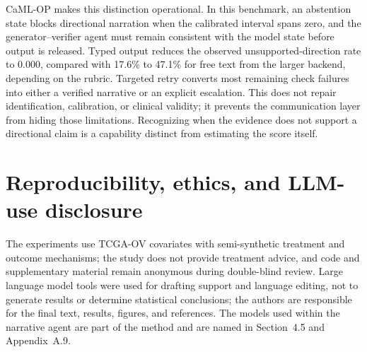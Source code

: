 \documentclass{article}
\begin{document}
CaML-OP makes this distinction operational. In this benchmark, an abstention state blocks directional narration when the calibrated interval spans zero, and the generator--verifier agent must remain consistent with the model state before output is released. Typed output reduces the observed unsupported-direction rate to 0.000, compared with 17.6\% to 47.1\% for free text from the larger backend, depending on the rubric. Targeted retry converts most remaining check failures into either a verified narrative or an explicit escalation. This does not repair identification, calibration, or clinical validity; it prevents the communication layer from hiding those limitations. Recognizing when the evidence does not support a directional claim is a capability distinct from estimating the score itself.

\section*{Reproducibility, ethics, and LLM-use disclosure}
The experiments use TCGA-OV covariates with semi-synthetic treatment and outcome mechanisms; the study does not provide treatment advice, and code and supplementary material remain anonymous during double-blind review. Large language model tools were used for drafting support and language editing, not to generate results or determine statistical conclusions; the authors are responsible for the final text, results, figures, and references. The models used within the narrative agent are part of the method and are named in Section~4.5 and Appendix~A.9.





\end{document}
